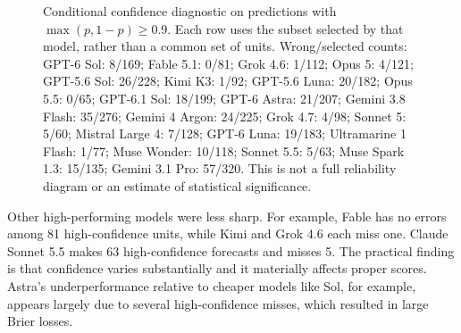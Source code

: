 \documentclass[11pt]{article}
\begin{document}
\begin{figure}[tb]
\caption{Conditional confidence diagnostic on predictions with $\max(p,1-p)\geq0.9$. Each row uses the subset selected by that model, rather than a common set of units. Wrong/selected counts: GPT-6 Sol: 8/169; Fable 5.1: 0/81; Grok 4.6: 1/112; Opus 5: 4/121; GPT-5.6 Sol: 26/228; Kimi K3: 1/92; GPT-5.6 Luna: 20/182; Opus 5.5: 0/65; GPT-6.1 Sol: 18/199; GPT-6 Astra: 21/207; Gemini 3.8 Flash: 35/276; Gemini 4 Argon: 24/225; Grok 4.7: 4/98; Sonnet 5: 5/60; Mistral Large 4: 7/128; GPT-6 Luna: 19/183; Ultramarine 1 Flash: 1/77; Muse Wonder: 10/118; Sonnet 5.5: 5/63; Muse Spark 1.3: 15/135; Gemini 3.1 Pro: 57/320. This is not a full reliability diagram or an estimate of statistical significance.}\label{fig:confidence}\end{figure}

Other high-performing models were less sharp. For example, Fable has no errors among 81 high-confidence units, while Kimi and Grok 4.6 each miss one. Claude Sonnet 5.5 makes 63 high-confidence forecasts and misses 5. The practical finding is that confidence varies substantially and it materially affects proper scores. Astra's underperformance relative to cheaper models like Sol, for example, appears largely due to several high-confidence misses, which resulted in large Brier losses.
\end{document}

